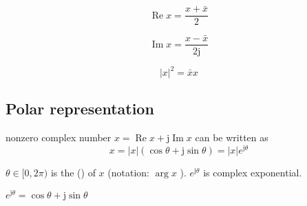 \begin{theorem}
    $$ \operatorname{Re} x=\frac{x+\bar{x}}{2} $$
\end{theorem}

\begin{theorem}
    $$ \operatorname{Im} x=\frac{x-\bar{x}}{2 \mathrm{j}} $$
\end{theorem}

\begin{theorem}
    $$ |x|^{2}=\bar{x} x $$
\end{theorem}

\subsection{Polar representation}

\begin{theorem}
    nonzero complex number $ x=\operatorname{Re} x+\mathrm{j} \operatorname{Im} x $ can be written as
$$
x=|x|(\cos \theta+\mathrm{j} \sin \theta)=|x| e^{\mathrm{j} \theta}
$$

$ \theta \in[0,2 \pi) $ is the  () of $ x $ (notation: $ \arg x $ ). $ e^{\mathrm{j} \theta} $ is complex exponential.
\end{theorem}

\begin{theorem}
    $ e^{\mathrm{j} \theta}=\cos \theta+\mathrm{j} \sin \theta $
\end{theorem}

